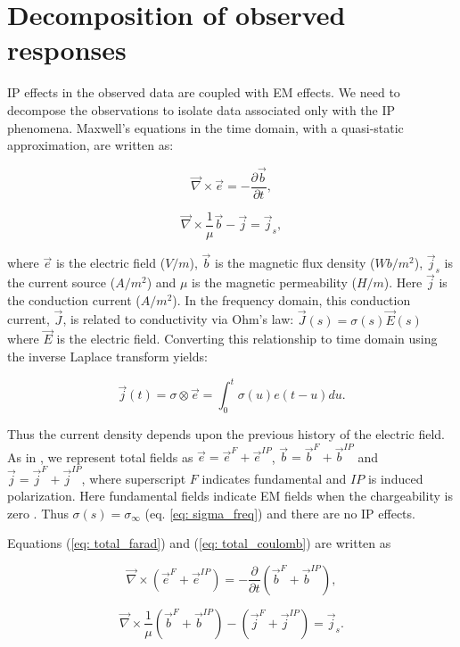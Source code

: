 \documentclass[extra,mreferee]{gji}
\newcommand{\curl}{{\vec \nabla}\times}
\newcommand {\J}{{\vec J}}
\newcommand {\E}{{\vec E}}
\newcommand{\siginf}{\sigma_\infty}
\renewcommand {\j}  { {\vec j} }
\renewcommand {\b}  { {\vec b} }
\newcommand {\e}  { {\vec e} }
\begin{document}
\section{Decomposition of observed responses}
IP effects in the observed data are coupled with EM effects. We need to decompose the observations to isolate data associated only with the IP phenomena.
Maxwell's equations in the time domain, with a quasi-static approximation, are written as:
\begin{linenomath*}
\begin{equation}
  \curl{\e} = -\frac{\partial \b}{\partial t},
  \label{eq: total_farad}
\end{equation}
\end{linenomath*}
\begin{linenomath*}
\begin{equation}
  \curl{\frac{1}{\mu}\b} - \j= \j_{s},
  \label{eq: total_coulomb}
\end{equation}
\end{linenomath*}
where $\e$ is the electric field ($V/m$), $\b$ is the magnetic flux density ($Wb/m^2$), $\j_{s}$ is the current source ($A/m^2$) and $\mu$ is the magnetic permeability ($H/m$). Here $\j$ is the conduction current ($A/m^2$). In the frequency domain, this conduction current, $\J$, is related to conductivity via Ohm’s law: $\J(s) = \sigma(s)\E(s)$ where $\E$ is the electric field.
Converting this relationship to time domain using the inverse Laplace transform yields:
\begin{linenomath*}
\begin{equation}
  \j(t) = \sigma \otimes \e = \int_0^t \sigma(u) e(t-u) du.
  \label{eq: ohms_law_convolution}
\end{equation}
\end{linenomath*}
Thus the current density depends upon the previous history of the electric field.
As in \cite{Smith1988a}, we represent total fields as $\e = \e^{F} + \e^{IP}$, $\b = \b^{F} + \b^{IP}$ and $\j = \j^{F} + \j^{IP}$, where superscript $F$ indicates fundamental and $IP$ is induced polarization.
Here fundamental fields indicate EM fields when the chargeability is zero . Thus  $\sigma(s) = \siginf$  (eq. \ref{eq: sigma_freq}) and there are no IP effects.

Equations (\ref{eq: total_farad}) and (\ref{eq: total_coulomb}) are written as
\begin{linenomath*}
\begin{equation}
  \curl({\e^{F}+\e^{IP}}) = -\frac{\partial}{\partial t} (\b^{F}+\b^{IP}),
\end{equation}
\end{linenomath*}
\begin{linenomath*}
\begin{equation}
  \curl\frac{1}{\mu}(\b^{F}+\b^{IP}) - (\j^{F}+\j^{IP})= \j_{s}.
\end{equation}
\end{linenomath*}
\end{document}
